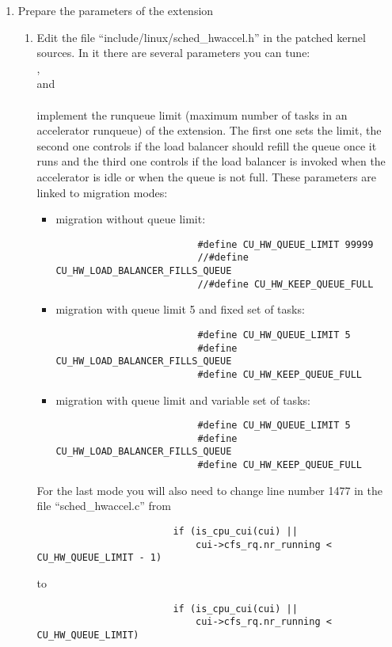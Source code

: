 \begin{enumerate}
	
	\item Prepare the parameters of the extension
		\begin{enumerate}
			\item Edit the file ``include/linux/sched\_hwaccel.h'' in the patched kernel sources. In it there are several parameters you can tune:\\
				 , \\
				  and \\
				 \\
				implement the runqueue limit (maximum number of tasks in an accelerator runqueue)
				of the extension. The first one sets the limit,
				the second one controls if the load balancer should refill the queue once
				it runs and the third one controls if the load balancer is invoked when
				the accelerator is idle or when the queue is not full. These
				parameters are linked to migration modes:
				\begin{itemize}
					\item migration without queue limit:
					\begin{verbatim}
						 #define CU_HW_QUEUE_LIMIT 99999
						 //#define CU_HW_LOAD_BALANCER_FILLS_QUEUE
						 //#define CU_HW_KEEP_QUEUE_FULL
					\end{verbatim}
					\item migration with queue limit 5 and fixed set of tasks:
					\begin{verbatim}
						 #define CU_HW_QUEUE_LIMIT 5
						 #define CU_HW_LOAD_BALANCER_FILLS_QUEUE
						 #define CU_HW_KEEP_QUEUE_FULL
					\end{verbatim}
					\item migration with queue limit and variable set of tasks:
					\begin{verbatim}
						 #define CU_HW_QUEUE_LIMIT 5
						 #define CU_HW_LOAD_BALANCER_FILLS_QUEUE
						 #define CU_HW_KEEP_QUEUE_FULL
					\end{verbatim}
				\end{itemize}
				 For the last mode you will also need to change line number 1477 in the file
				 ``sched\_hwaccel.c'' from
					\begin{verbatim}
						if (is_cpu_cui(cui) || 
							cui->cfs_rq.nr_running < CU_HW_QUEUE_LIMIT - 1)
					\end{verbatim}
				 to
					\begin{verbatim}
						if (is_cpu_cui(cui) || 
							cui->cfs_rq.nr_running < CU_HW_QUEUE_LIMIT)

\end{verbatim}
\end{enumerate}
\end{enumerate}
